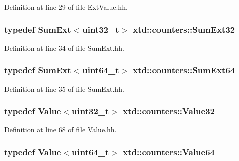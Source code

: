 Definition at line 29 of file Ext\+Value.\+hh.

\subsubsection[{\texorpdfstring{Sum\+Ext32}{SumExt32}}]{\setlength{\rightskip}{0pt plus 5cm}typedef {\bf Sum\+Ext}$<$uint32\+\_\+t$>$ {\bf xtd\+::counters\+::\+Sum\+Ext32}}\hypertarget{namespacextd_1_1counters_a7e0abdd1fae0f70421c2e0ea3924db6f}{}\label{namespacextd_1_1counters_a7e0abdd1fae0f70421c2e0ea3924db6f}


Definition at line 34 of file Sum\+Ext.\+hh.

\subsubsection[{\texorpdfstring{Sum\+Ext64}{SumExt64}}]{\setlength{\rightskip}{0pt plus 5cm}typedef {\bf Sum\+Ext}$<$uint64\+\_\+t$>$ {\bf xtd\+::counters\+::\+Sum\+Ext64}}\hypertarget{namespacextd_1_1counters_a268d063d4f32d16f65c388b8791602e3}{}\label{namespacextd_1_1counters_a268d063d4f32d16f65c388b8791602e3}


Definition at line 35 of file Sum\+Ext.\+hh.

\subsubsection[{\texorpdfstring{Value32}{Value32}}]{\setlength{\rightskip}{0pt plus 5cm}typedef {\bf Value}$<$uint32\+\_\+t$>$ {\bf xtd\+::counters\+::\+Value32}}\hypertarget{namespacextd_1_1counters_ad10dfbcb762ad7dfc7199ab5a268bc6e}{}\label{namespacextd_1_1counters_ad10dfbcb762ad7dfc7199ab5a268bc6e}


Definition at line 68 of file Value.\+hh.

\subsubsection[{\texorpdfstring{Value64}{Value64}}]{\setlength{\rightskip}{0pt plus 5cm}typedef {\bf Value}$<$uint64\+\_\+t$>$ {\bf xtd\+::counters\+::\+Value64}}\hypertarget{namespacextd_1_1counters_a20cdfbbbf5aa96abb1c5d461497d1769}{}\label{namespacextd_1_1counters_a20cdfbbbf5aa96abb1c5d461497d1769}


